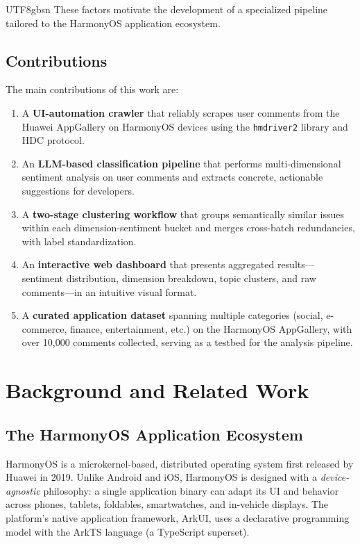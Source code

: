 \documentclass[11pt,a4paper]{article}
\begin{document}
\begin{CJK*}{UTF8}{gbsn}
These factors motivate the development of a specialized pipeline tailored to the HarmonyOS application ecosystem.

\subsection{Contributions}

The main contributions of this work are:

\begin{enumerate}[nosep]
  \item A \textbf{UI-automation crawler} that reliably scrapes user comments from the Huawei AppGallery on HarmonyOS devices using the \texttt{hmdriver2} library and HDC protocol.
  \item An \textbf{LLM-based classification pipeline} that performs multi-dimensional sentiment analysis on user comments and extracts concrete, actionable suggestions for developers.
  \item A \textbf{two-stage clustering workflow} that groups semantically similar issues within each dimension-sentiment bucket and merges cross-batch redundancies, with label standardization.
  \item An \textbf{interactive web dashboard} that presents aggregated results---sentiment distribution, dimension breakdown, topic clusters, and raw comments---in an intuitive visual format.
  \item A \textbf{curated application dataset} spanning multiple categories (social, e-commerce, finance, entertainment, etc.) on the HarmonyOS AppGallery, with over 10,000 comments collected, serving as a testbed for the analysis pipeline.
\end{enumerate}


\section{Background and Related Work}

\subsection{The HarmonyOS Application Ecosystem}

HarmonyOS is a microkernel-based, distributed operating system first released by Huawei in 2019. Unlike Android and iOS, HarmonyOS is designed with a \emph{device-agnostic} philosophy: a single application binary can adapt its UI and behavior across phones, tablets, foldables, smartwatches, and in-vehicle displays. The platform's native application framework, ArkUI, uses a declarative programming model with the ArkTS language (a TypeScript superset).


\end{CJK*}
\end{document}
